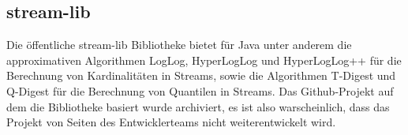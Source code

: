 \subsection{stream-lib}
Die öffentliche stream-lib Bibliotheke bietet für Java unter anderem die approximativen Algorithmen LogLog, 
HyperLogLog und HyperLogLog++ für die Berechnung von Kardinalitäten in Streams, 
sowie die Algorithmen T-Digest und Q-Digest für die Berechnung von Quantilen in Streams. 
Das Github-Projekt auf dem die Bibliotheke basiert wurde archiviert, 
es ist also warscheinlich, dass das Projekt von Seiten des Entwicklerteams nicht weiterentwickelt wird. 
